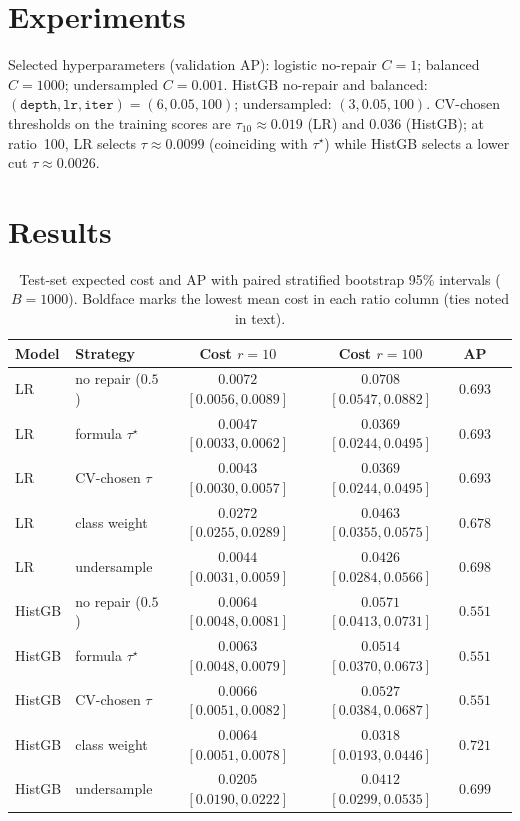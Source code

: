 \documentclass[10pt,twocolumn,letterpaper]{article}
\begin{document}
\section{Experiments}
Selected hyperparameters (validation AP): logistic no-repair $C{=}1$; balanced $C{=}1000$; undersampled $C{=}0.001$.
HistGB no-repair and balanced: $(\texttt{depth},\texttt{lr},\texttt{iter})=(6,0.05,100)$; undersampled: $(3,0.05,100)$.
CV-chosen thresholds on the training scores are $\tau_{10}{\approx}0.019$ (LR) and $0.036$ (HistGB); at ratio~100, LR selects $\tau{\approx}0.0099$ (coinciding with $\tau^{\star}$) while HistGB selects a lower cut $\tau{\approx}0.0026$.

\section{Results}
\begin{table}[t]
\centering
\caption{Test-set expected cost and AP with paired stratified bootstrap 95\% intervals ($B{=}1000$). Boldface marks the lowest mean cost in each ratio column (ties noted in text).}
\label{tab:main}
\setlength{\tabcolsep}{3pt}
\begin{tabular}{llcccc}
\toprule
Model & Strategy & Cost $r{=}10$ & Cost $r{=}100$ & AP \\
\midrule
LR & no repair ($0.5$) & $0.0072$ $[0.0056,0.0089]$ & $0.0708$ $[0.0547,0.0882]$ & $0.693$ \\
LR & formula $\tau^{\star}$ & $0.0047$ $[0.0033,0.0062]$ & $0.0369$ $[0.0244,0.0495]$ & $0.693$ \\
LR & CV-chosen $\tau$ & $\mathbf{0.0043}$ $[0.0030,0.0057]$ & $0.0369$ $[0.0244,0.0495]$ & $0.693$ \\
LR & class weight & $0.0272$ $[0.0255,0.0289]$ & $0.0463$ $[0.0355,0.0575]$ & $0.678$ \\
LR & undersample & $0.0044$ $[0.0031,0.0059]$ & $0.0426$ $[0.0284,0.0566]$ & $0.698$ \\
\midrule
HistGB & no repair ($0.5$) & $0.0064$ $[0.0048,0.0081]$ & $0.0571$ $[0.0413,0.0731]$ & $0.551$ \\
HistGB & formula $\tau^{\star}$ & $0.0063$ $[0.0048,0.0079]$ & $0.0514$ $[0.0370,0.0673]$ & $0.551$ \\
HistGB & CV-chosen $\tau$ & $0.0066$ $[0.0051,0.0082]$ & $0.0527$ $[0.0384,0.0687]$ & $0.551$ \\
HistGB & class weight & $0.0064$ $[0.0051,0.0078]$ & $\mathbf{0.0318}$ $[0.0193,0.0446]$ & $0.721$ \\
HistGB & undersample & $0.0205$ $[0.0190,0.0222]$ & $0.0412$ $[0.0299,0.0535]$ & $0.699$ \\
\bottomrule
\end{tabular}
\end{table}
\end{document}
